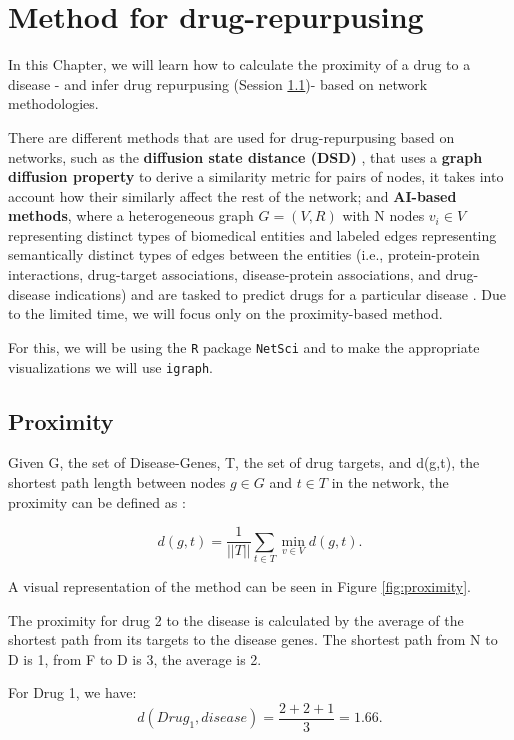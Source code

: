\documentclass[
]{book}
\begin{document}
\hypertarget{method-for-drug-repurpusing}{%
\chapter{Method for drug-repurpusing}\label{method-for-drug-repurpusing}}

In this Chapter, we will learn how to calculate the proximity of a drug to a disease - and infer drug repurpusing (Session \ref{proximity})- based on network methodologies.

There are different methods that are used for drug-repurpusing based on networks, such as the \textbf{diffusion state distance (DSD)} \citep{Cao2013}, that uses a \textbf{graph diffusion property} to derive a similarity metric for pairs of nodes, it takes into account how their similarly affect the rest of the network; and \textbf{AI-based methods}, where a heterogeneous graph \(G = (V,R)\) with N nodes \(v_i \in V\) representing distinct types of biomedical entities and labeled edges representing semantically distinct types of edges between the entities (i.e., protein-protein interactions, drug-target associations, disease-protein associations, and drug-disease indications) and are tasked to predict drugs for a particular disease \citep{Zitnik2018}. Due to the limited time, we will focus only on the proximity-based method.

For this, we will be using the \texttt{R} package \texttt{NetSci} and to make the appropriate visualizations we will use \texttt{igraph}.

\hypertarget{proximity}{%
\section{Proximity}\label{proximity}}

Given G, the set of Disease-Genes, T, the set of drug targets, and d(g,t), the shortest path length between nodes \(g \in G\) and \(t \in T\) in the network, the proximity can be defined as \citep{Guney2016}:

\[ 
d(g,t)  = \frac{1}{|\left|T\right||}\sum_{t\in T}\underset{v\in V}\min{d(g,t)}.
\]

A visual representation of the method can be seen in Figure \ref{fig:proximity}.

The proximity for drug 2 to the disease is calculated by the average of the shortest path from its targets to the disease genes. The shortest path from N to D is 1, from F to D is 3, the average is 2.

For Drug 1, we have:
\[d(Drug_1, disease) = \frac{2 + 2 + 1}{3} = 1.66.\]
\end{document}

